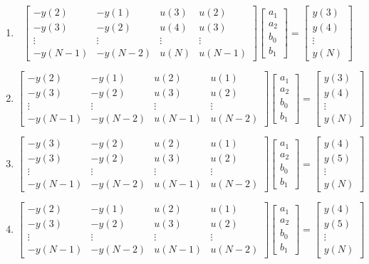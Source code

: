 \documentclass[letterpaper,12pt]{scrartcl}
\newenvironment{exercise}[1][Problem]{\begin{trivlist} \item[\hskip
    \labelsep {\stepcounter{exerctr}\bfseries #1
      \arabic{exerctr}}]}{\end{trivlist}\vspace{10mm}}
\newcounter{exerctr}
\newcommand{\bbm}{\begin{bmatrix}}
\newcommand{\ebm}{\end{bmatrix}}
\begin{document}
\begin{exercise}
\begin{enumerate}
  \item
    \begin{displaymath}
      \bbm -y(2) & -y(1) & u(3) & u(2)\\
      -y(3) & -y(2) & u(4) & u(3)\\
      \vdots & \vdots & \vdots & \vdots\\
      -y(N-1) & -y(N-2) & u(N) & u(N-1)\ebm \bbm a_1\\a_2\\b_0\\b_1\ebm = \bbm y(3)\\y(4)\\\vdots\\y(N)\ebm
    \end{displaymath}
  \item
    \begin{displaymath}
      \bbm -y(2) & -y(1) & u(2) & u(1)\\
      -y(3) & -y(2) & u(3) & u(2)\\
      \vdots & \vdots & \vdots & \vdots\\
      -y(N-1) & -y(N-2) & u(N-1) & u(N-2)\ebm \bbm a_1\\a_2\\b_0\\b_1\ebm = \bbm y(3)\\y(4)\\\vdots\\y(N)\ebm
    \end{displaymath}
  \item
    \begin{displaymath}
      \bbm -y(3) & -y(2) & u(2) & u(1)\\
      -y(3) & -y(2) & u(3) & u(2)\\
      \vdots & \vdots & \vdots & \vdots\\
      -y(N-1) & -y(N-2) & u(N-1) & u(N-2)\ebm \bbm a_1\\a_2\\b_0\\b_1\ebm = \bbm y(4)\\y(5)\\\vdots\\y(N)\ebm
    \end{displaymath}
  \item
    \begin{displaymath}
      \bbm -y(2) & -y(1) & u(2) & u(1)\\
      -y(3) & -y(2) & u(3) & u(2)\\
      \vdots & \vdots & \vdots & \vdots\\
      -y(N-1) & -y(N-2) & u(N-1) & u(N-2)\ebm \bbm a_1\\a_2\\b_0\\b_1\ebm = \bbm y(4)\\y(5)\\\vdots\\y(N)\ebm
    \end{displaymath}
  \end{enumerate}
\end{exercise}
\end{document}
